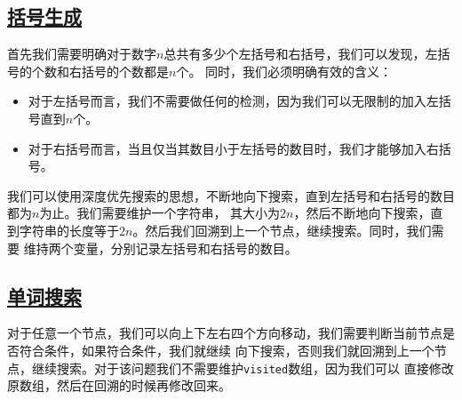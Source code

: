 \documentclass[../../main.tex]{subfiles}
\begin{document}



\subsection{\href{https://leetcode.cn/problems/generate-parentheses/}{括号生成}}

首先我们需要明确对于数字$n$总共有多少个左括号和右括号，我们可以发现，左括号的个数和右括号的个数都是$n$个。
同时，我们必须明确有效的含义：

\begin{itemize}
  \item 对于左括号而言，我们不需要做任何的检测，因为我们可以无限制的加入左括号直到$n$个。
  \item 对于右括号而言，当且仅当其数目小于左括号的数目时，我们才能够加入右括号。
\end{itemize}

我们可以使用深度优先搜索的思想，不断地向下搜索，直到左括号和右括号的数目都为$n$为止。我们需要维护一个字符串，
其大小为$2n$，然后不断地向下搜索，直到字符串的长度等于$2n$。然后我们回溯到上一个节点，继续搜索。同时，我们需要
维持两个变量，分别记录左括号和右括号的数目。



\subsection{\href{https://leetcode.cn/problems/word-search/}{单词搜索}}

对于任意一个节点，我们可以向上下左右四个方向移动，我们需要判断当前节点是否符合条件，如果符合条件，我们就继续
向下搜索，否则我们就回溯到上一个节点，继续搜索。对于该问题我们不需要维护\texttt{visited}数组，因为我们可以
直接修改原数组，然后在回溯的时候再修改回来。
\end{document}
